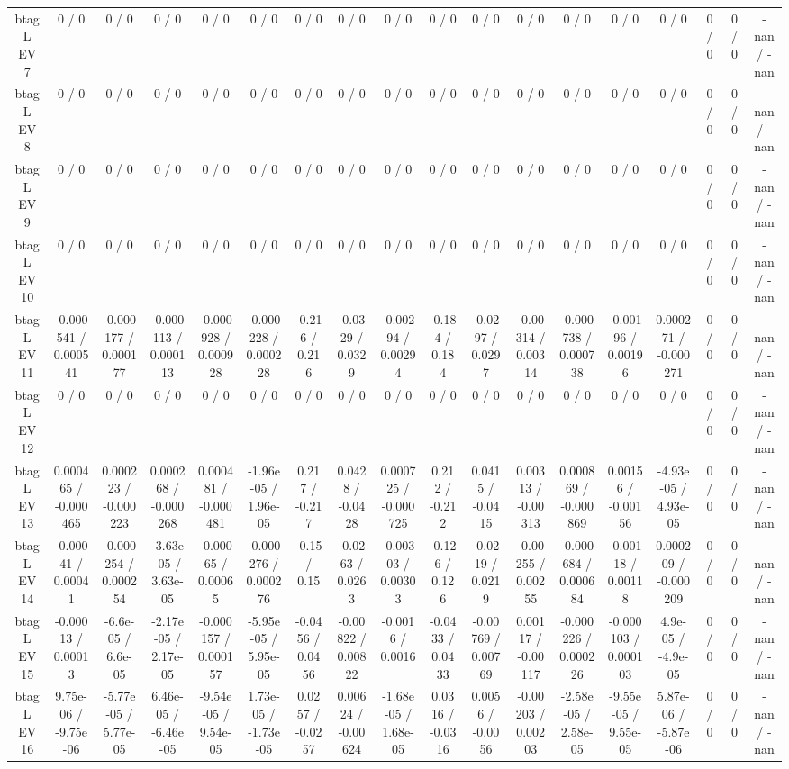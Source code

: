 \documentclass[10pt]{article}
\begin{document}
\begin{table}[htbp]
\begin{center}
\begin{tabular}{|c|c|c|c|c|c|c|c|c|c|c|c|c|c|c|c|c|c|}
  btag L EV 7 & 0 / 0 & 0 / 0 & 0 / 0 & 0 / 0 & 0 / 0 & 0 / 0 & 0 / 0 & 0 / 0 & 0 / 0 & 0 / 0 & 0 / 0 & 0 / 0 & 0 / 0 & 0 / 0 & 0 / 0 & 0 / 0 & -nan / -nan \\ 
  btag L EV 8 & 0 / 0 & 0 / 0 & 0 / 0 & 0 / 0 & 0 / 0 & 0 / 0 & 0 / 0 & 0 / 0 & 0 / 0 & 0 / 0 & 0 / 0 & 0 / 0 & 0 / 0 & 0 / 0 & 0 / 0 & 0 / 0 & -nan / -nan \\ 
  btag L EV 9 & 0 / 0 & 0 / 0 & 0 / 0 & 0 / 0 & 0 / 0 & 0 / 0 & 0 / 0 & 0 / 0 & 0 / 0 & 0 / 0 & 0 / 0 & 0 / 0 & 0 / 0 & 0 / 0 & 0 / 0 & 0 / 0 & -nan / -nan \\ 
  btag L EV 10 & 0 / 0 & 0 / 0 & 0 / 0 & 0 / 0 & 0 / 0 & 0 / 0 & 0 / 0 & 0 / 0 & 0 / 0 & 0 / 0 & 0 / 0 & 0 / 0 & 0 / 0 & 0 / 0 & 0 / 0 & 0 / 0 & -nan / -nan \\ 
  btag L EV 11 & -0.000541 / 0.000541 & -0.000177 / 0.000177 & -0.000113 / 0.000113 & -0.000928 / 0.000928 & -0.000228 / 0.000228 & -0.216 / 0.216 & -0.0329 / 0.0329 & -0.00294 / 0.00294 & -0.184 / 0.184 & -0.0297 / 0.0297 & -0.00314 / 0.00314 & -0.000738 / 0.000738 & -0.00196 / 0.00196 & 0.000271 / -0.000271 & 0 / 0 & 0 / 0 & -nan / -nan \\ 
  btag L EV 12 & 0 / 0 & 0 / 0 & 0 / 0 & 0 / 0 & 0 / 0 & 0 / 0 & 0 / 0 & 0 / 0 & 0 / 0 & 0 / 0 & 0 / 0 & 0 / 0 & 0 / 0 & 0 / 0 & 0 / 0 & 0 / 0 & -nan / -nan \\ 
  btag L EV 13 & 0.000465 / -0.000465 & 0.000223 / -0.000223 & 0.000268 / -0.000268 & 0.000481 / -0.000481 & -1.96e-05 / 1.96e-05 & 0.217 / -0.217 & 0.0428 / -0.0428 & 0.000725 / -0.000725 & 0.212 / -0.212 & 0.0415 / -0.0415 & 0.00313 / -0.00313 & 0.000869 / -0.000869 & 0.00156 / -0.00156 & -4.93e-05 / 4.93e-05 & 0 / 0 & 0 / 0 & -nan / -nan \\ 
  btag L EV 14 & -0.00041 / 0.00041 & -0.000254 / 0.000254 & -3.63e-05 / 3.63e-05 & -0.00065 / 0.00065 & -0.000276 / 0.000276 & -0.15 / 0.15 & -0.0263 / 0.0263 & -0.00303 / 0.00303 & -0.126 / 0.126 & -0.0219 / 0.0219 & -0.00255 / 0.00255 & -0.000684 / 0.000684 & -0.00118 / 0.00118 & 0.000209 / -0.000209 & 0 / 0 & 0 / 0 & -nan / -nan \\ 
  btag L EV 15 & -0.00013 / 0.00013 & -6.6e-05 / 6.6e-05 & -2.17e-05 / 2.17e-05 & -0.000157 / 0.000157 & -5.95e-05 / 5.95e-05 & -0.0456 / 0.0456 & -0.00822 / 0.00822 & -0.0016 / 0.0016 & -0.0433 / 0.0433 & -0.00769 / 0.00769 & 0.00117 / -0.00117 & -0.000226 / 0.000226 & -0.000103 / 0.000103 & 4.9e-05 / -4.9e-05 & 0 / 0 & 0 / 0 & -nan / -nan \\ 
  btag L EV 16 & 9.75e-06 / -9.75e-06 & -5.77e-05 / 5.77e-05 & 6.46e-05 / -6.46e-05 & -9.54e-05 / 9.54e-05 & 1.73e-05 / -1.73e-05 & 0.0257 / -0.0257 & 0.00624 / -0.00624 & -1.68e-05 / 1.68e-05 & 0.0316 / -0.0316 & 0.0056 / -0.0056 & -0.00203 / 0.00203 & -2.58e-05 / 2.58e-05 & -9.55e-05 / 9.55e-05 & 5.87e-06 / -5.87e-06 & 0 / 0 & 0 / 0 & -nan / -nan \\ 

\end{tabular}
\end{center}
\end{table}
\end{document}
